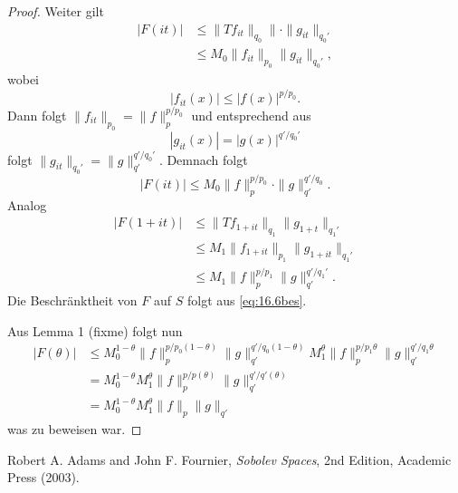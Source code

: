 \documentclass[
paper=a4,
bibtotocnumbered,
liststotocnumbered,
tablecaptionabove,
pointlessnumbers,
twoside,
openright,
10pt
]
{report}
\theoremstyle{definition}
\numberwithin{equation}{chapter}
\begin{document}
\begin{proof}
Weiter gilt
\begin{align*}
|F(it)|&\le \| Tf_{it}\|_{q_0} \|\cdot \|g_{it}\|_{q_0'}\\
&\le M_0 \| f_{it} \|_{p_0} \| g_{it} \|_{q_0'},
\end{align*}
wobei 
\begin{equation}
|f_{it}(x)|\le | f(x)|^{p/p_0}.
\end{equation}
Dann folgt $\| f_{it}\|_{p_0} = \| f\|_p^{p/p_0}$ und entsprechend aus
\begin{equation}
|g_{it}(x)| = |g(x)|^{q'/q_0'}
\end{equation}
folgt  $\| g_{it}\|_{q_0'} = \|g\|_{q'}^{q'/q_0'}$.
Demnach folgt
\begin{equation}
|F(it)|\le M_0 \| f\|_p^{p/p_0} \cdot \| g\|_{q'}^{q'/q_0}.
\end{equation}
Analog
\begin{align*}
|F(1+it)|&\le \| Tf_{1+it} \|_{q_1} \| g_{1+t} \|_{q_1'} \\
&\le M_1 \| f_{1+it} \|_{p_1} \| g_{1+it} \|_{q_1'} \\
&\le M_1\|f\|_p^{p/p_1} \| g\|_{q'}^{q'/q_1'}.
\end{align*}
Die Beschränktheit von $F$ auf $S$ folgt aus \eqref{eq:16.6bes}.  

Aus Lemma 1 (fixme) folgt nun
\begin{align*}
|F(\theta)| &\le M_0^{1-\theta} \| f\|_p^{p/p_0(1-\theta)} \| g\|_{q'} ^{q'/q_0(1-\theta)} M_1^\theta \| f\|_p^{p/p_1 \theta} \| g\|_{q'}^{q'/q_1 \theta}\\
&= M_0^{1-\theta} M_1^\theta \| f\|_p^{p/p(\theta)} \| g\|_{q'}^{q'/q'(\theta)}\\
&= M_0^{1-\theta} M_1^\theta \| f\|_p \| g\|_{q'}
\end{align*} 
was zu beweisen war.
\end{proof}

\begin{thebibliography}{xxx}
 Robert A. Adams and John F.  Fournier, \textit{Sobolev Spaces}, 2nd Edition, Academic Press (2003).
\end{thebibliography}
\end{document}
